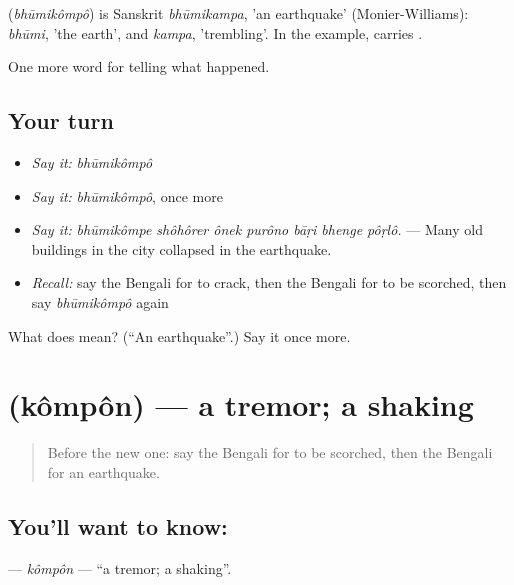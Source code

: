 \begin{cousinweb}
\textbf{} (\emph{bhūmikômpô}) is Sanskrit \emph{bhūmikampa}, 'an earthquake' (Monier-Williams): \emph{bhūmi}, 'the earth', and \emph{kampa}, 'trembling'. In the example,  carries .
\end{cousinweb}

\begin{grammarlens}[title={What you've built}]
One more word for telling what happened.
\end{grammarlens}

\subsection*{Your turn}
\begin{itemize}
\raggedright
  \item \emph{Say it:} \emph{bhūmikômpô}
  \item \emph{Say it:} \emph{bhūmikômpô}, once more
  \item \emph{Say it:} \emph{bhūmikômpe shôhôrer ônek purôno bāṛi bhenge pôṛlô.} — Many old buildings in the city collapsed in the earthquake.
  \item \emph{Recall:} say the Bengali for to crack, then the Bengali for to be scorched, then say \emph{bhūmikômpô} again
\end{itemize}

\begin{tcolorbox}[breakable,colback=teal!4,colframe=teal!35!black,title={Before you move on}]
What does  mean? (\textquotedblleft{}An earthquake\textquotedblright{}.) Say it once more.
\end{tcolorbox}
\section[\texorpdfstring{\bn{কম্পন} (kômpôn)}{কম্পন (kômpôn)}]{ (kômpôn) — a tremor; a shaking}

\label{lesson:BN-C293-kompon}



\begin{quote}
Before the new one: say the Bengali for to be scorched, then the Bengali for an earthquake.
\end{quote}

\subsection*{You'll want to know: }
\textbf{} — \emph{kômpôn} — \textquotedblleft{}a tremor; a shaking\textquotedblright{}.

